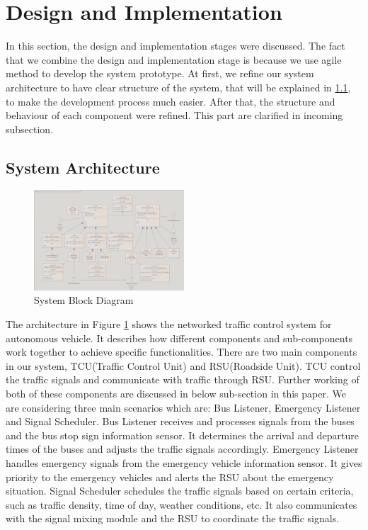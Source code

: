 \section{Design and Implementation}
\label{sec:design_and_implementation}

In this section, the design and implementation stages were discussed. The fact that we combine the design and implementation stage is because we use agile method to develop the system prototype. At first, we refine our system architecture to have clear structure of the system, that will be explained in \ref{subsec:system_architecture}, to make the development process much easier. After that, the structure and behaviour of each component were refined. This part are clarified in incoming subsection.

\subsection{System Architecture}
\label{subsec:system_architecture}
\begin{figure}[ht]
    \centering
    \includegraphics[width=0.5\textwidth]{images/system_bdd.png}
    \caption{System Block Diagram }
    \label{img:system_bdd}
\end{figure}
The architecture in Figure \ref{img:system_bdd} shows the networked traffic control system for autonomous vehicle. It describes how different components and sub-components work together to achieve specific functionalities. There are two main components in our system, TCU(Traffic Control Unit) and RSU(Roadside Unit). TCU control the traffic signals and communicate with traffic through RSU. Further working of both of these components are discussed in below sub-section in this paper. We are considering three main scenarios which are: Bus Listener, Emergency Listener and Signal Scheduler.
Bus Listener receives and processes signals from the buses and the bus stop sign information sensor. It determines the arrival and departure times of the buses and adjusts the traffic signals accordingly.
Emergency Listener handles emergency signals from the emergency vehicle information sensor. It gives priority to the emergency vehicles and alerts  the RSU about the emergency situation.
Signal Scheduler schedules the traffic signals based on certain criteria, such as traffic density, time of day, weather conditions, etc. It also communicates with the signal mixing module and the RSU to coordinate the traffic signals.



